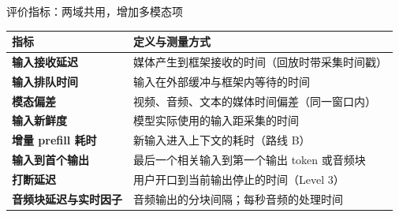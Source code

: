 \begin{frame}[t]{评价指标：两域共用，增加多模态项}
\scriptsize
\renewcommand{\arraystretch}{1.1}
\setlength{\tabcolsep}{3pt}
\begin{tabularx}{\textwidth}{>{\bfseries}p{3.0cm} Y}
\toprule
{}
指标 & 定义与测量方式 \\
\midrule
输入接收延迟 & 媒体产生到框架接收的时间（回放时带采集时间戳） \\
输入排队时间 & 输入在外部缓冲与框架内等待的时间 \\
模态偏差 & 视频、音频、文本的媒体时间偏差（同一窗口内） \\
输入新鲜度 & 模型实际使用的输入距采集的时间 \\
增量 prefill 耗时 & 新输入进入上下文的耗时（路线 B） \\
输入到首个输出 & 最后一个相关输入到第一个输出 token 或音频块 \\
打断延迟 & 用户开口到当前输出停止的时间（Level 3） \\
音频块延迟与实时因子 & 音频输出的分块间隔；每秒音频的处理时间 \\
\bottomrule
\end{tabularx}
\par{}
\par{}
\end{frame}
